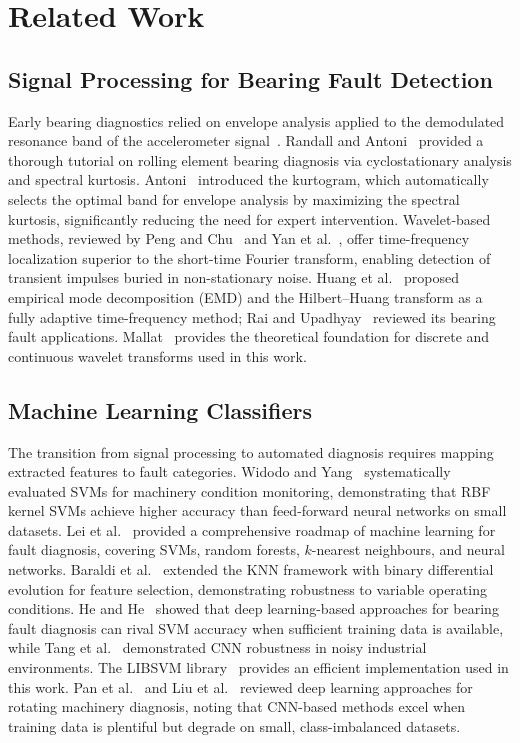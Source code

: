 \documentclass[conference,a4paper]{IEEEtran}[2015/08/26]
\begin{document}
\section{Related Work}
\label{sec:related}

\subsection{Signal Processing for Bearing Fault Detection}

Early bearing diagnostics relied on envelope analysis applied to the
demodulated resonance band of the accelerometer signal~\cite{McFadden1984}.
Randall and Antoni~\cite{Randall2001} provided a thorough tutorial on
rolling element bearing diagnosis via cyclostationary analysis and
spectral kurtosis. Antoni~\cite{Antoni2006,Antoni2007} introduced the
kurtogram, which automatically selects the optimal band for envelope
analysis by maximizing the spectral kurtosis, significantly reducing
the need for expert intervention. Wavelet-based methods, reviewed by
Peng and Chu~\cite{Peng2005} and Yan et al.~\cite{Yan2014}, offer
time-frequency localization superior to the short-time Fourier
transform, enabling detection of transient impulses buried in
non-stationary noise. Huang et al.~\cite{Huang1998} proposed empirical
mode decomposition (EMD) and the Hilbert--Huang transform as a fully
adaptive time-frequency method; Rai and Upadhyay~\cite{Rai2016}
reviewed its bearing fault applications. Mallat~\cite{Mallat2009}
provides the theoretical foundation for discrete and continuous
wavelet transforms used in this work.

\subsection{Machine Learning Classifiers}

The transition from signal processing to automated diagnosis requires
mapping extracted features to fault categories. Widodo and
Yang~\cite{Widodo2007} systematically evaluated SVMs for machinery
condition monitoring, demonstrating that RBF kernel SVMs achieve higher
accuracy than feed-forward neural networks on small datasets. Lei et
al.~\cite{Lei2020} provided a comprehensive roadmap of machine learning
for fault diagnosis, covering SVMs, random forests, $k$-nearest
neighbours, and neural networks. Baraldi et al.~\cite{Baraldi2015}
extended the KNN framework with binary differential evolution for
feature selection, demonstrating robustness to variable operating
conditions. He and He~\cite{He2020} showed that deep learning-based
approaches for bearing fault diagnosis can rival SVM accuracy when
sufficient training data is available, while Tang et
al.~\cite{Tang2020} demonstrated CNN robustness in noisy industrial
environments. The LIBSVM library~\cite{Chang2011}
provides an efficient implementation used in this work. Pan et
al.~\cite{Pan2010} and Liu et al.~\cite{Liu2018} reviewed deep learning
approaches for rotating machinery diagnosis, noting that CNN-based
methods excel when training data is plentiful but degrade on small,
class-imbalanced datasets.
\end{document}
